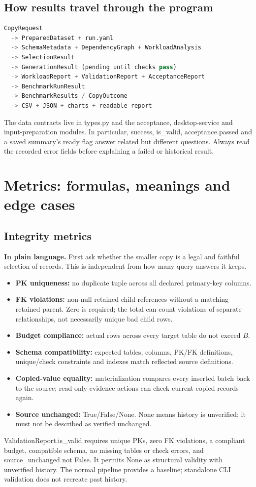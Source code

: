 \documentclass[11pt,a4paper,oneside]{report}
\newcommand{\plain}[1]{\par\textbf{In plain language.} #1\par}
\begin{document}
\section{How results travel through the program}
\begin{lstlisting}[language=Python]
CopyRequest
  -> PreparedDataset + run.yaml
  -> SchemaMetadata + DependencyGraph + WorkloadAnalysis
  -> SelectionResult
  -> GenerationResult (pending until checks pass)
  -> WorkloadReport + ValidationReport + AcceptanceReport
  -> BenchmarkRunResult
  -> BenchmarkResults / CopyOutcome
  -> CSV + JSON + charts + readable report
\end{lstlisting}
The data contracts live in types.py and the acceptance, desktop-service and input-preparation modules. In particular, success, is\_valid, acceptance.passed and a saved summary's ready flag answer related but different questions. Always read the recorded error fields before explaining a failed or historical result.

\chapter{Metrics: formulas, meanings and edge cases}
\section{Integrity metrics}
\plain{First ask whether the smaller copy is a legal and faithful selection of records. This is independent from how many query answers it keeps.}
\begin{itemize}
\item \textbf{PK uniqueness:} no duplicate tuple across all declared primary-key columns.
\item \textbf{FK violations:} non-null retained child references without a matching retained parent. Zero is required; the total can count violations of separate relationships, not necessarily unique bad child rows.
\item \textbf{Budget compliance:} actual rows across every target table do not exceed $B$.
\item \textbf{Schema compatibility:} expected tables, columns, PK/FK definitions, unique/check constraints and indexes match reflected source definitions.
\item \textbf{Copied-value equality:} materialization compares every inserted batch back to the source; read-only evidence actions can check current copied records again.
\item \textbf{Source unchanged:} True/False/None. None means history is unverified; it must not be described as verified unchanged.
\end{itemize}
ValidationReport.is\_valid requires unique PKs, zero FK violations, a compliant budget, compatible schema, no missing tables or check errors, and source\_unchanged not False. It permits None as structural validity with unverified history. The normal pipeline provides a baseline; standalone CLI validation does not recreate past history.
\end{document}
